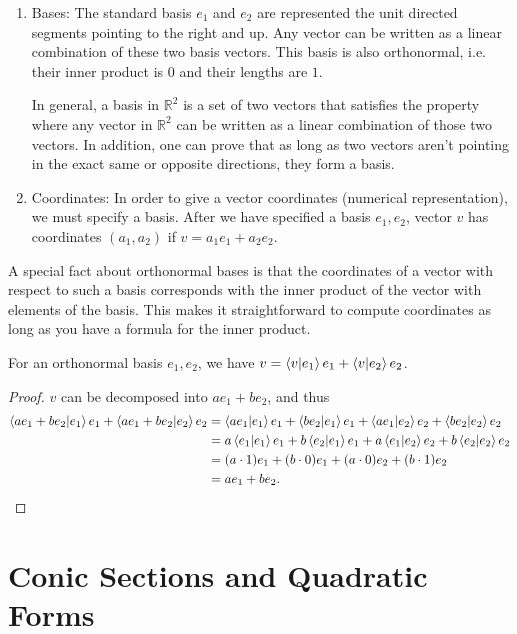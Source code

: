 \begin{enumerate}
    \item Bases: The standard basis $e_1$ and $e_2$ are represented the unit directed segments pointing to the right and up. Any vector can be written as a linear combination of these two basis vectors. This basis is also orthonormal, i.e. their inner product is $0$ and their lengths are $1$. 
    
    In general, a basis in $\mathbb R^2$ is a set of two vectors that satisfies the property where any vector in $\mathbb R^2$ can be written as a linear combination of those two vectors. In addition, one can prove that as long as two vectors aren't pointing in the exact same or opposite directions, they form a basis.
    
    \item Coordinates: In order to give a vector coordinates (numerical representation), we must specify a basis. After we have specified a basis $e_1, e_2$, vector $v$ has coordinates $(a_1, a_2)$ if $v = a_1e_1 + a_2e_2$.
\end{enumerate}

A special fact about orthonormal bases is that the coordinates of a vector with respect to such a basis corresponds with the inner product of the vector with elements of the basis. This makes it straightforward to compute coordinates as long as you have a formula for the inner product.

\begin{theorem}
    For an orthonormal basis $e_1, e_2$, we have $v = \bra{v}\ket{e_1}e_1 + \bra{v}\ket{e_2}e_2$.
\end{theorem}

\begin{proof}
    $v$ can be decomposed into $ae_1 + be_2$, and thus \begin{align*}
        \braket{ae_1 + be_2}{e_1}e_1 + \braket{ae_1 + be_2}{e_2}e_2 &= \braket{ae_1}{e_1}e_1 + \braket{be_2}{e_1}e_1 + \braket{ae_1}{e_2}e_2 + \braket{be_2}{e_2}e_2\\
        &= a\braket{e_1}{e_1}e_1 + b\braket{e_2}{e_1}e_1 + a\braket{e_1}{e_2}e_2 + b\braket{e_2}{e_2}e_2\\
        &= (a \cdot 1)e_1 + (b \cdot 0)e_1 + (a \cdot 0)e_2 + (b \cdot 1)e_2\\
        &= ae_1 + be_2.
    \end{align*}
\end{proof}

\section{Conic Sections and Quadratic Forms}


